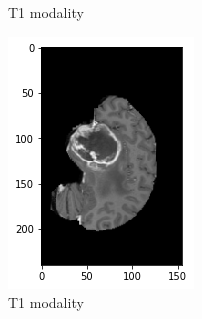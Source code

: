 \begin{figure}[H]
\begin{subfigure}{.2\textwidth}
        \caption{T1 modality}
    \end{subfigure}%
    \begin{subfigure}{.2\textwidth}
        \centering
        \includegraphics[width=\linewidth]{chapters/04_segmentation/images/brats/1.png}
        \caption{T1 modality}
    \end{subfigure}%
        \begin{subfigure}{.2\textwidth}
        \centering

\end{subfigure}
\end{figure}

